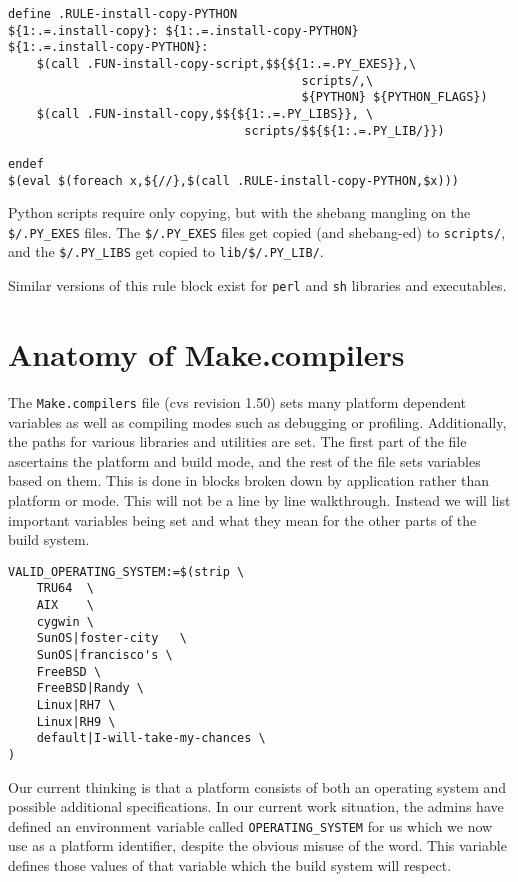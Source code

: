 \documentclass[letterpaper]{article}
\begin{document}
\begin{verbatim}
define .RULE-install-copy-PYTHON
${1:.=.install-copy}: ${1:.=.install-copy-PYTHON}
${1:.=.install-copy-PYTHON}:
	$(call .FUN-install-copy-script,$${${1:.=.PY_EXES}},\
                                         scripts/,\
                                         ${PYTHON} ${PYTHON_FLAGS})
	$(call .FUN-install-copy,$${${1:.=.PY_LIBS}}, \
                                 scripts/$${${1:.=.PY_LIB/}})

endef
$(eval $(foreach x,${//},$(call .RULE-install-copy-PYTHON,$x)))
\end{verbatim}
Python scripts require only copying, but with the shebang mangling
on the \verb+$/.PY_EXES+ files.  The \verb+$/.PY_EXES+ files get
copied (and shebang-ed) to \verb+scripts/+, and the
\verb+$/.PY_LIBS+ get copied to \verb+lib/$/.PY_LIB/+.

Similar versions of this rule block exist for \verb+perl+ and \verb+sh+
libraries and executables.

\section{Anatomy of Make.compilers}

The \verb+Make.compilers+ file (cvs revision 1.50) sets many platform
dependent variables as well as compiling modes such as debugging or
profiling.  Additionally, the paths for various libraries and
utilities are set.  The first part of the file ascertains the platform
and build mode, and the rest of the file sets variables based on them.
This is done in blocks broken down by application rather than platform
or mode.  This will not be a line by line walkthrough.  Instead we
will list important variables being set and what they mean for the
other parts of the build system.

\begin{verbatim}
VALID_OPERATING_SYSTEM:=$(strip \
    TRU64  \
    AIX    \
    cygwin \
    SunOS|foster-city   \
    SunOS|francisco's \
    FreeBSD \
    FreeBSD|Randy \
    Linux|RH7 \
    Linux|RH9 \
    default|I-will-take-my-chances \
)
\end{verbatim}
Our current thinking is that a platform consists of both an operating
system and possible additional specifications.  In our current work
situation, the admins have defined an environment variable called
\verb+OPERATING_SYSTEM+ for us which we now use as a platform
identifier, despite the obvious misuse of the word.  This variable defines
those values of that variable which the build system will respect.
\end{document}
